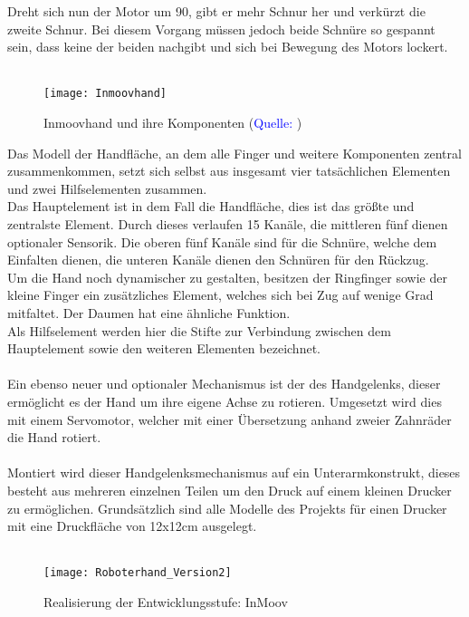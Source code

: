 \documentclass[titlepage,12pt,twoside]{article}
\begin{document}
Dreht sich nun der Motor um 90\textdegree, gibt er mehr Schnur her und verkürzt die zweite Schnur. Bei diesem Vorgang müssen jedoch beide Schnüre so gespannt sein, dass keine der beiden nachgibt und sich bei Bewegung des Motors lockert. \\
\\
\begin{figure}[H]
	\begin{center}
		\scalebox{0.8}
		{\texttt{[image: Inmoovhand]}}
		\caption{Inmoovhand und ihre Komponenten (\textcolor{blue}{Quelle: \cite{Inmoovhand}})}
		\label{fig:Inmoovhand}			
	\end{center}
\end{figure}
\hfill \break
Das Modell der Handfläche, an dem alle Finger und weitere Komponenten zentral zusammenkommen, setzt sich selbst aus insgesamt vier tatsächlichen Elementen und zwei Hilfselementen zusammen. \\
Das Hauptelement ist in dem Fall die Handfläche, dies ist das größte und zentralste Element. Durch dieses verlaufen 15 Kanäle, die mittleren fünf dienen optionaler Sensorik. Die oberen fünf Kanäle sind für die Schnüre, 
welche dem Einfalten dienen, die unteren Kanäle dienen den Schnüren für den Rückzug. \\
Um die Hand noch dynamischer zu gestalten, besitzen der Ringfinger sowie der kleine Finger ein zusätzliches Element, welches sich bei Zug auf wenige Grad mitfaltet. Der Daumen hat eine ähnliche Funktion. \\
Als Hilfselement werden hier die Stifte zur Verbindung zwischen dem Hauptelement sowie den weiteren Elementen bezeichnet. \\
\\
Ein ebenso neuer und optionaler Mechanismus ist der des Handgelenks, dieser ermöglicht es der Hand um ihre eigene Achse zu rotieren. Umgesetzt wird dies mit einem Servomotor, welcher mit einer Übersetzung anhand zweier Zahnräder die Hand rotiert. \\
\\
Montiert wird dieser Handgelenksmechanismus auf ein Unterarmkonstrukt, dieses besteht aus mehreren einzelnen Teilen um den Druck auf einem kleinen Drucker zu ermöglichen. Grundsätzlich sind alle Modelle des Projekts  für einen Drucker 
mit eine Druckfläche von 12x12cm ausgelegt. \\
\\
\begin{figure}[H]
	\begin{center}
		\scalebox{1.2}
		{\texttt{[image: Roboterhand\_Version2]}}
		\caption{Realisierung der Entwicklungsstufe: InMoov}
		\label{fig:Roboterhand_Version2}			
	\end{center}
\end{figure}
\end{document}
